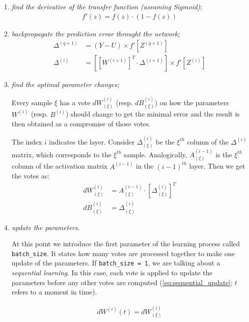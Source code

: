 \begin{enumerate}
\item \textit{find the derivative of the transfer function (assuming Sigmoid)};
\begin{align} \label{eq:transfer_function_der}
f'(z) = f(z) \cdot (1-f(z))
\end{align}
\item \textit{backpropagate the prediction error throught the network;}
\begin{align} \label{eq:error_backprop}
\Delta^{(q+1)} &= (Y-U) \times f'[Z^{(q+1)}] \\
\Delta^{(i)} &= \left[\left[W^{(i+1)}\right]^T \cdot \Delta^{(i+1)}\right] \times f'[Z^{(i)}]
\end{align}
\item \textit{find the optimal parameter changes;}

Every sample $ \xi $ has a vote $ dW^{(i)}_{(\xi)} $ (resp. $ dB^{(i)}_{(\xi)} $) on how the parameters $ W^{(i)} $ (resp. $ B^{(i)} $) should change to get the minimal error and the result is then obtained as a compromise of those votes.

The index $ i $ indicates the layer. Consider $ \Delta^{(i)}_{(\xi)} $ be the $ \xi^{th} $ column of the $ \Delta^{(i)} $ matrix, which corresponds to the $ \xi^{th} $ sample. Analogically, $ A^{(i-1)}_{(\xi)} $ is the $ \xi^{th} $ column of the activation matrix $ A^{(i-1)} $ in the $ (i-1)^{th} $ layer. Then we get the votes as:
\begin{align} \label{eq:part_derivative}
dW^{(i)}_{(\xi)} &= A^{(i-1)}_{(\xi)} \cdot \left[\Delta^{(i)}_{(\xi)}\right]^T\\
dB^{(i)}_{(\xi)} &= \Delta^{(i)}_{(\xi)}
\end{align}
\item \textit{update the parameters.}

At this point we introduce the first parameter of the learning process called \texttt{batch\_size}. It states how many votes are processed together to make one update of the parameters. If \texttt{batch\_size = 1}, we are talking about a \textit{sequential learning}. In this case, each vote is applied to update the parameters before any other votes are computed (\cref{eq:sequential_update}; $ t $ refers to a moment in time). 

\begin{align} \label{eq:sequential_update}
dW^{(i)}(t) = dW^{(i)}_{(\xi)}
\end{align}


\end{enumerate}
